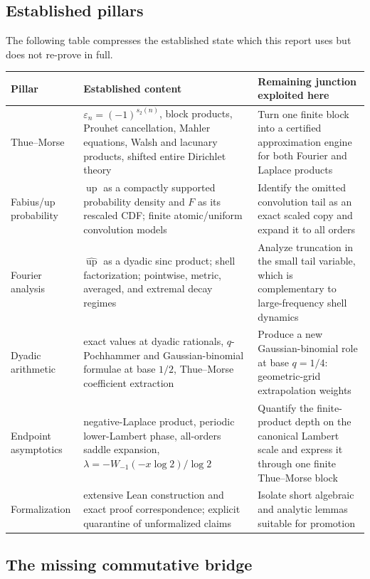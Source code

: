 \documentclass[11pt,oneside]{article}
\numberwithin{equation}{section}
\theoremstyle{definition}
\theoremstyle{remark}
\newcommand{\Up}{\operatorname{up}}
\newcommand{\eps}{\varepsilon}
\begin{document}
\subsection{Established pillars}

The following table compresses the established state which this report uses but does not
re-prove in full.

\begin{center}
\small
\begin{tabularx}{\textwidth}{@{}p{}X X@{}}
\toprule
Pillar & Established content & Remaining junction exploited here \\
\midrule
Thue--Morse & $\eps_n=(-1)^{s_2(n)}$, block products, Prouhet cancellation, Mahler equations,
Walsh and lacunary products, shifted entire Dirichlet theory & Turn one finite block into a
certified approximation engine for both Fourier and Laplace products \\
Fabius/up probability & $\Up$ as a compactly supported probability density and $F$ as its
rescaled CDF; finite atomic/uniform convolution models & Identify the omitted convolution tail
as an exact scaled copy and expand it to all orders \\
Fourier analysis & $\widehat{\Up}$ as a dyadic sinc product; shell factorization; pointwise,
metric, averaged, and extremal decay regimes & Analyze truncation in the small tail variable,
which is complementary to large-frequency shell dynamics \\
Dyadic arithmetic & exact values at dyadic rationals, $q$-Pochhammer and Gaussian-binomial
formulae at base $1/2$, Thue--Morse coefficient extraction & Produce a new Gaussian-binomial
role at base $q=1/4$: geometric-grid extrapolation weights \\
Endpoint asymptotics & negative-Laplace product, periodic lower-Lambert phase, all-orders saddle
expansion, $\lambda=-W_{-1}(-x\log2)/\log2$ & Quantify the finite-product depth on the canonical
Lambert scale and express it through one finite Thue--Morse block \\
Formalization & extensive Lean construction and exact proof correspondence; explicit quarantine
of unformalized claims & Isolate short algebraic and analytic lemmas suitable for promotion \\
\bottomrule
\end{tabularx}
\end{center}

\subsection{The missing commutative bridge}
\end{document}
